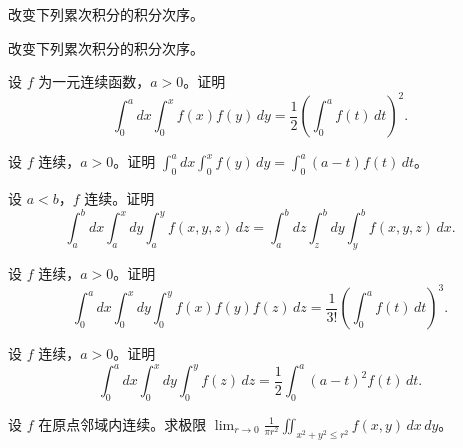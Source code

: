 \noindent\begin{minipage}{\textwidth}
改变下列累次积分的积分次序。
\end{minipage}\par\vfill
\noindent\begin{minipage}{\textwidth}
改变下列累次积分的积分次序。
\end{minipage}\par\vfill
\newpage
\noindent\begin{minipage}{\textwidth}
设 $f$ 为一元连续函数，$a>0$。证明\[\int_0^a dx\int_0^x f(x)f(y)\,dy=\frac12\left(\int_0^af(t)\,dt\right)^2.\]
\end{minipage}\par\vfill
\noindent\begin{minipage}{\textwidth}
设 $f$ 连续，$a>0$。证明 $\int_0^a dx\int_0^xf(y)\,dy=\int_0^a(a-t)f(t)\,dt$。
\end{minipage}\par\vfill
\noindent\begin{minipage}{\textwidth}
设 $a<b$，$f$ 连续。证明\[\int_a^b dx\int_a^xdy\int_a^yf(x,y,z)\,dz=\int_a^b dz\int_z^bdy\int_y^bf(x,y,z)\,dx.\]
\end{minipage}\par\vfill
\newpage
\noindent\begin{minipage}{\textwidth}
设 $f$ 连续，$a>0$。证明\[\int_0^a dx\int_0^xdy\int_0^yf(x)f(y)f(z)\,dz=\frac1{3!}\left(\int_0^af(t)\,dt\right)^3.\]
\end{minipage}\par\vfill
\noindent\begin{minipage}{\textwidth}
设 $f$ 连续，$a>0$。证明\[\int_0^a dx\int_0^xdy\int_0^yf(z)\,dz=\frac12\int_0^a(a-t)^2f(t)\,dt.\]
\end{minipage}\par\vfill
\noindent\begin{minipage}{\textwidth}
设 $f$ 在原点邻域内连续。求极限 $\displaystyle\lim_{r\to0}\frac1{\pi r^2}\iint_{x^2+y^2\le r^2}f(x,y)\,dx\,dy$。
\end{minipage}\par\vfill

